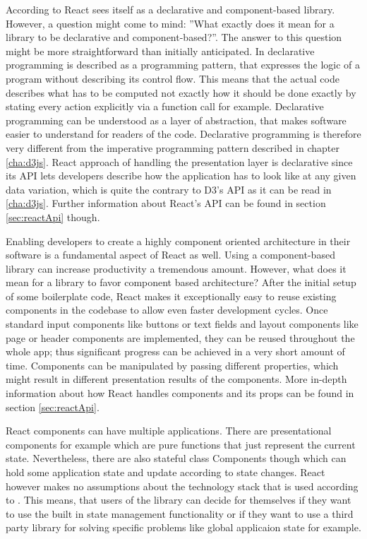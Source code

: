 According to \cite{React} React sees itself as a declarative and component-based library. However, a question might come to mind: ''What exactly does it mean for a library to be declarative and component-based?''. The answer to this question might be more straightforward than initially anticipated. In \cite{lloyd1994practical} declarative programming is described as a programming pattern, that expresses the logic of a program without describing its control flow. This means that the actual code describes what has to be computed not exactly how it should be done exactly by stating every action explicitly via a function call for example. Declarative programming can be understood as a layer of abstraction, that makes software easier to understand for readers of the code. Declarative programming is therefore very different from the imperative programming pattern described in chapter \ref{cha:d3js}. React approach of handling the presentation layer is declarative since its API lets developers describe how the application has to look like at any given data variation, which is quite the contrary to D3's API as it can be read in \ref{cha:d3js}. Further information about React's API can be found in section \ref{sec:reactApi} though.

Enabling developers to create a highly component oriented architecture in their software is a fundamental aspect of React as well. Using a component-based library can increase productivity a tremendous amount. However, what does it mean for a library to favor component based architecture? After the initial setup of some boilerplate code, React makes it exceptionally easy to reuse existing components in the codebase to allow even faster development cycles. Once standard input components like buttons or text fields and layout components like page or header components are implemented, they can be reused throughout the whole app; thus significant progress can be achieved in a very short amount of time. Components can be manipulated by passing different properties, which might result in different presentation results of the components. More in-depth information about how React handles components and its props can be found in section \ref{sec:reactApi}.

React components can have multiple applications. There are presentational components for example which are pure functions that just represent the current state. Nevertheless, there are also stateful class Components though which can hold some application state and update according to state changes. React however makes no assumptions about the technology stack that is used according to \cite{React}. This means, that users of the library can decide for themselves if they want to use the built in state management functionality or if they want to use a third party library for solving specific problems like global applicaion state for example.
    
